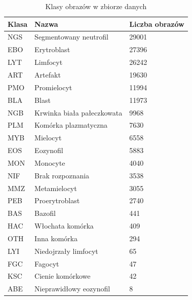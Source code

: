 \begin{table}
    \begin{center}
        \caption{Klasy obrazów w zbiorze danych}
        \label{tab:images_count}
        \begin{tabular}{|l|l|l|}
            \hline
            Klasa & Nazwa & Liczba obrazów \\
            \hline
            NGS & Segmentowany neutrofil & 29001 \\
            \hline
            EBO & Erytroblast & 27396 \\
            \hline
            LYT & Limfocyt & 26242 \\
            \hline
            ART & Artefakt & 19630 \\
            \hline
            PMO & Promielocyt & 11994 \\
            \hline
            BLA & Blast & 11973 \\
            \hline
            NGB & Krwinka biała pałeczkowata & 9968 \\
            \hline
            PLM & Komórka plazmatyczna & 7630 \\
            \hline
            MYB & Mielocyt & 6558 \\
            \hline
            EOS & Eozynofil & 5883 \\
            \hline
            MON & Monocyte & 4040 \\
            \hline
            NIF & Brak rozpoznania & 3538 \\
            \hline
            MMZ & Metamielocyt & 3055 \\
            \hline
            PEB & Proerytroblast & 2740 \\
            \hline
            BAS & Bazofil & 441 \\
            \hline
            HAC & Włochata komórka & 409 \\
            \hline
            OTH & Inna komórka & 294 \\
            \hline
            LYI & Niedojrzały limfocyt & 65 \\
            \hline
            FGC & Fagocyt & 47 \\
            \hline
            KSC & Cienie komórkowe & 42 \\
            \hline
            ABE & Nieprawidłowy eozynofil & 8 \\
            \hline
        \end{tabular}
    \end{center}
\end{table}

